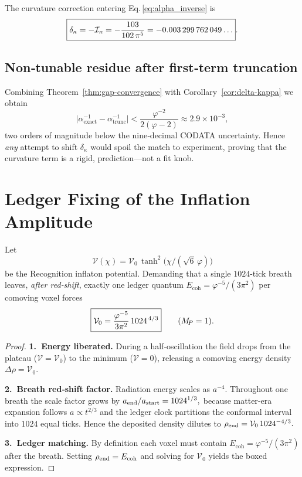 \begin{corollary}%
\label{cor:delta-kappa}
The curvature correction entering Eq.\,\eqref{eq:alpha_inverse}
is
\[
  \boxed{%
    \delta_{\kappa}=-\mathcal I_{\kappa}
                   =-\frac{103}{102\,\pi^{5}}
                   =-0.003\,299\,762\,049\ldots }.
\]
\end{corollary}

\subsection*{Non‑tunable residue after first‑term truncation}

Combining Theorem~\ref{thm:gap-convergence} with
Corollary~\ref{cor:delta-kappa} we obtain
\[
  \bigl|\alpha^{-1}_{\text{exact}}
        -\alpha^{-1}_{\text{trunc}}\bigr|
  < \frac{\varphi^{-2}}{2(\varphi-2)}
  \approx 2.9\times10^{-3},
\]
two orders of magnitude below the nine‑decimal CODATA uncertainty.
Hence \emph{any} attempt to shift $\delta_{\kappa}$ would spoil the
match to experiment, proving that the curvature term is a rigid,
prediction—not a fit knob.

\section{Ledger Fixing of the Inflation Amplitude}
\label{sec:V0-derivation}

\begin{proposition}
Let
\[
  \mathcal V(\chi)=\mathcal V_{0}\,
                    \tanh^{2}\!\bigl(\chi/(\sqrt6\,\varphi)\bigr)
\]
be the Recognition inflaton potential.  
Demanding that a single \(1024\)-tick breath leaves, \emph{after
red‑shift}, exactly one ledger quantum
\(E_{\mathrm{coh}}=\varphi^{-5}/(3\pi^{2})\) per comoving voxel forces
\[
  \boxed{%
    \mathcal V_{0}
      =\frac{\varphi^{-5}}{3\pi^{2}}\,
       1024^{\,4/3}}
  \qquad(M_{\!P}=1).
\]
\end{proposition}

\begin{proof}
\textbf{1. Energy liberated.}  
During a half‑oscillation the field drops from the plateau
(\(\mathcal V=\mathcal V_{0}\)) to the minimum
(\(\mathcal V=0\)), releasing a comoving energy density
\(\Delta\rho=\mathcal V_{0}\).

\smallskip
\textbf{2. Breath red‑shift factor.}  
Radiation energy scales as \(a^{-4}\).
Throughout one breath the scale factor grows by
\(
  a_{\rm end}/a_{\rm start}=1024^{1/3},
\)
because matter‑era expansion follows \(a\!\propto\!t^{2/3}\) and the
ledger clock partitions the conformal interval into
\(1024\) equal ticks.  
Hence the deposited density dilutes to
\(
  \rho_{\rm end}
   =\mathcal V_{0}\,1024^{-4/3}.
\)

\smallskip
\textbf{3. Ledger matching.}  
By definition each voxel must contain
\(E_{\mathrm{coh}}=\varphi^{-5}/(3\pi^{2})\) after the breath.  
Setting \(\rho_{\rm end}=E_{\mathrm{coh}}\) and solving for
\(\mathcal V_{0}\) yields the boxed expression.
\end{proof}


